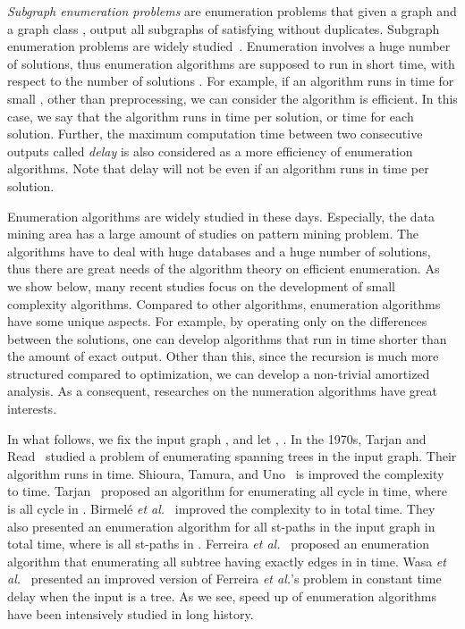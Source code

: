 \documentclass{llncs}
\newcommand{\name}[1]{\textit{#1}}
\begin{document}
\name{Subgraph enumeration problems} are enumeration problems 
that given a graph  and a graph class , 
output all subgraphs  of  satisfying  without duplicates. 
Subgraph enumeration problems are widely studied~\cite{Avis:Fukuda:DAM:1996,Ferreira:Grossi:Rizzi:ESA:2011,Shioura:Tamura:Uno:SIAM:1997,Tarjan:Read:1975,Wasa:COCOON:2012,Birmele:etal:SODA:2013,Uno:SIGAL:2003,Tarjan:1973}. 
Enumeration involves a huge number of solutions, 
thus enumeration algorithms are supposed to run in short time, 
with respect to the number of solutions . 
For example, if an algorithm runs in  time for small , 
other than preprocessing, 
we can consider the algorithm is efficient. 
In this case, 
we say that the algorithm runs in  time per solution, 
or  time for each solution. 
Further, 
the maximum computation time between two consecutive outputs called \name{delay} is 
also considered as a more efficiency of enumeration algorithms. 
Note that delay will not be  
even if an algorithm runs in  time per solution. 

Enumeration algorithms are widely studied in these days. 
Especially, 
the data mining area has a large amount of studies on pattern mining problem. 
The algorithms have to deal with huge databases and a huge number of solutions, 
thus there are great needs of the algorithm theory on efficient enumeration. 
As we show below, 
many recent studies focus on the development of small complexity algorithms. 
Compared to other algorithms, 
enumeration algorithms have some unique aspects. 
For example, 
by operating only on the differences between the solutions, 
one can develop algorithms that 
run in time shorter than the amount of exact output. 
Other than this, 
since the recursion is much more structured compared to optimization, 
we can develop a non-trivial amortized analysis. 
As a consequent, 
researches on the numeration algorithms have great interests. 

In what follows, 
we fix the input graph , 
and let , . 
In the 1970s, 
Tarjan and Read~\cite{Tarjan:Read:1975} studied 
a problem of enumerating spanning trees in the input graph. 
Their algorithm runs in  time. 
Shioura, Tamura, and Uno~\cite{Shioura:Tamura:Uno:SIAM:1997} 
is improved the complexity to  time. 
Tarjan~\cite{Tarjan:1973} proposed an algorithm for enumerating all cycle 
in  time, 
where  is all cycle in . 
Birmel\'{e} \textit{et al.}~\cite{Birmele:etal:SODA:2013} 
improved the complexity to 
in  total time. 
They also presented an enumeration algorithm for
all st-paths in the input graph  
in  total time, 
where  is all st-paths in . 
Ferreira \textit{et al.}~\cite{Ferreira:Grossi:Rizzi:ESA:2011} proposed 
an enumeration algorithm 
that enumerating all subtree having exactly  edges in  in  time. 
Wasa \textit{et al.}~\cite{Wasa:COCOON:2012} presented 
an improved version of Ferreira \textit{et al.}'s problem in constant time delay 
when the input is a tree. 
As we see, 
speed up of enumeration algorithms have been intensively studied in long history. 
\end{document}
